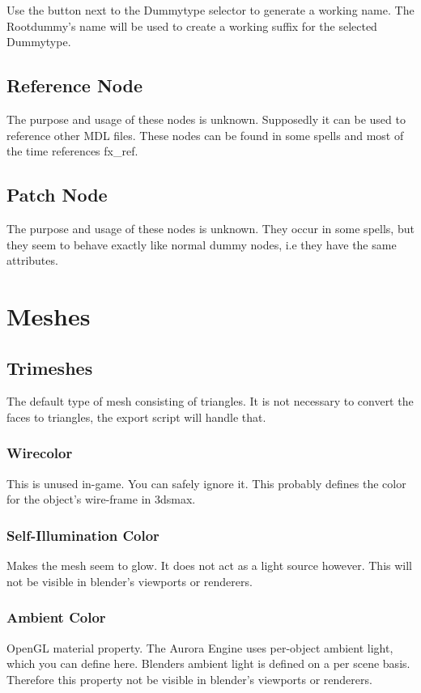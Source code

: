 Use the button next to the Dummytype selector to generate a
working name. The Rootdummy's name will be used to create a working
suffix for the selected Dummytype. \\

\subsection{Reference Node}
The purpose and usage of these nodes is unknown. Supposedly it can be used to
reference other MDL files. These nodes can be found in some spells and
most of the time references fx\_ref.

\subsection{Patch Node}
The purpose and usage of these nodes is unknown. They occur in some spells, but
they seem to behave exactly like normal dummy nodes, i.e they have the same
attributes.

\section{Meshes}

\subsection{Trimeshes}
The default type of mesh consisting of triangles. It is not necessary to convert 
the faces to triangles, the export script will handle that.

\subsubsection*{Wirecolor}
This is unused in-game. You can safely ignore it. This probably defines the
color for the object's wire-frame in 3dsmax.

\subsubsection*{Self-Illumination Color}
Makes the mesh seem to glow. It does not act as a light source however.
This will not be visible in blender's viewports or renderers.

\subsubsection*{Ambient Color}
OpenGL material property. The Aurora Engine uses per-object ambient light,
which you can define here. Blenders ambient light is defined on a per scene
basis. Therefore this property not be visible in blender's viewports or
renderers.

